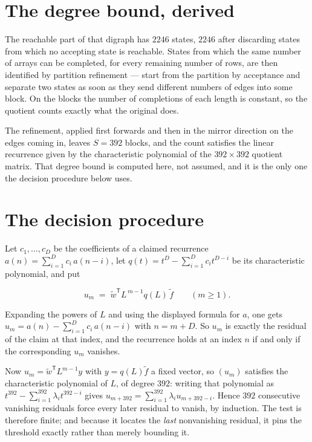 \documentclass[11pt]{article}
\theoremstyle{definition}
\begin{document}
\section{The degree bound, derived}

The reachable part of that digraph has $2246$ states, $2246$ after discarding states from which no accepting state is reachable. States from which the same number of arrays can be completed, for every remaining number of rows, are then identified by partition refinement --- start from the partition by acceptance and separate two states as soon as they send different numbers of edges into some block. On the blocks the number of completions of each length is constant, so the quotient counts exactly what the original does.

The refinement, applied first forwards and then in the mirror direction on the edges coming in, leaves $S = 392$ blocks, and the count satisfies the linear recurrence given by the characteristic polynomial of the $392 \times 392$ quotient matrix. That degree bound is computed here, not assumed, and it is the only one the decision procedure below uses.

\section{The decision procedure}

Let $c_1,\dots,c_D$ be the coefficients of a claimed recurrence $a(n) = \sum_{i=1}^{D} c_i\,a(n-i)$, let $q(t) = t^{D} - \sum_{i=1}^{D} c_i t^{D-i}$ be its characteristic polynomial, and put

\[u_m \;=\; \tilde w^{\mathsf T} L^{\,m-1} q(L)\,\tilde f \qquad (m \ge 1).\]

Expanding the powers of $L$ and using the displayed formula for $a$, one gets $u_m = a(n) - \sum_{i=1}^{D} c_i\,a(n-i)$ with $n = m + D$. So $u_m$ is exactly the residual of the claim at that index, and the recurrence holds at an index $n$ if and only if the corresponding $u_m$ vanishes.

Now $u_m = \tilde w^{\mathsf T} L^{m-1} y$ with $y = q(L)\tilde f$ a fixed vector, so $(u_m)$ satisfies the characteristic polynomial of $L$, of degree $392$: writing that polynomial as $t^{392} - \sum_{i=1}^{392} \lambda_i t^{392-i}$ gives $u_{m+392} = \sum_{i=1}^{392} \lambda_i u_{m+392-i}$. Hence $392$ consecutive vanishing residuals force every later residual to vanish, by induction. The test is therefore finite; and because it locates the {\itshape last} nonvanishing residual, it pins the threshold exactly rather than merely bounding it.
\end{document}
